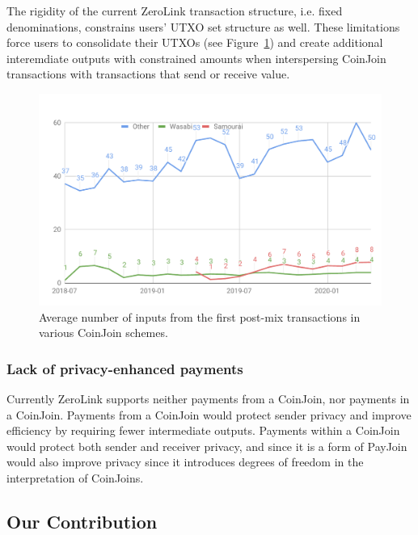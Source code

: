 \documentclass{article}
\begin{document}
The rigidity of the current ZeroLink transaction structure, i.e. fixed denominations, constrains users' UTXO set structure as well. These limitations force users to consolidate their UTXOs (see Figure~\ref{fig:postmixmerging}) and create additional interemdiate outputs with constrained amounts when interspersing CoinJoin transactions with transactions that send or receive value.

\begin{figure}[h!]
    \centering
    \includegraphics[scale=0.4]{Figures/postMixInputMerging.pdf}
    \caption[]{Average number of inputs from the first post-mix transactions in various CoinJoin schemes.\footnotemark}
    \label{fig:postmixmerging}
\end{figure}


\subsubsection{Lack of privacy-enhanced payments} Currently ZeroLink supports neither payments from a CoinJoin, nor payments in a CoinJoin. Payments from a CoinJoin would protect sender privacy and improve efficiency by requiring fewer intermediate outputs. Payments within a CoinJoin would protect both sender and receiver privacy, and since it is a form of PayJoin~\cite{payjoin} would also improve privacy since it introduces degrees of freedom in the interpretation of CoinJoins.

\subsection{Our Contribution}
\end{document}
